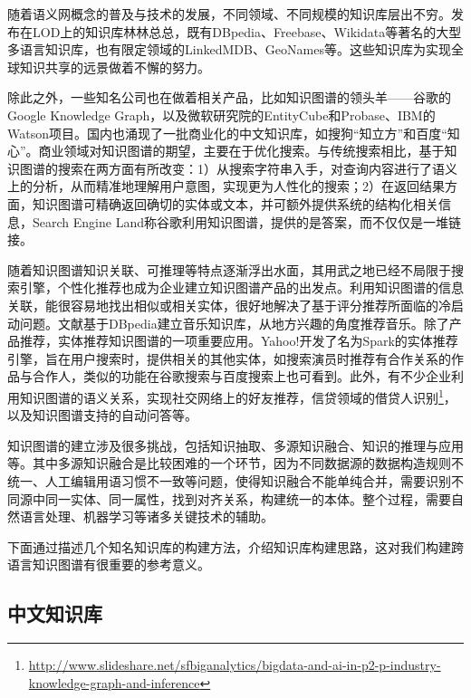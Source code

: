 随着语义网概念的普及与技术的发展，不同领域、不同规模的知识库层出不穷。发布在LOD上的知识库林林总总，既有DBpedia、Freebase、Wikidata等著名的大型多语言知识库，也有限定领域的LinkedMDB\cite{erxleben2014introducing}、GeoNames\cite{wick2011geonames}等。这些知识库为实现全球知识共享的远景做着不懈的努力。

除此之外，一些知名公司也在做着相关产品，比如知识图谱的领头羊——谷歌的Google Knowledge Graph\cite{singhal2012introducing}，以及微软研究院的EntityCube\cite{nie2012statistical}和Probase\cite{wu2012probase}、IBM的Watson项目\cite{ferrucci2012introduction}。国内也涌现了一批商业化的中文知识库，如搜狗“知立方”和百度“知心”。商业领域对知识图谱的期望，主要在于优化搜索。与传统搜索相比，基于知识图谱的搜索在两方面有所改变：1）从搜索字符串入手，对查询内容进行了语义上的分析，从而精准地理解用户意图，实现更为人性化的搜索；2）在返回结果方面，知识图谱可精确返回确切的实体或文本，并可额外提供系统的结构化相关信息，Search Engine Land称谷歌利用知识图谱，提供的是答案，而不仅仅是一堆链接\cite{sullivan2012google}。

随着知识图谱知识关联、可推理等特点逐渐浮出水面，其用武之地已经不局限于搜索引擎，个性化推荐也成为企业建立知识图谱产品的出发点\cite{Burke00knowledge-basedrecommender,aggarwal2016knowledge}。利用知识图谱的信息关联，能很容易地找出相似或相关实体，很好地解决了基于评分推荐所面临的冷启动问题。文献\cite{passant2010dbrec,kaminskas2012knowledge}基于DBpedia建立音乐知识库，从地方兴趣的角度推荐音乐。除了产品推荐，实体推荐知识图谱的一项重要应用。Yahoo!开发了名为Spark的实体推荐引擎\cite{blanco2013entity}，旨在用户搜索时，提供相关的其他实体，如搜索演员时推荐有合作关系的作品与合作人，类似的功能在谷歌搜索与百度搜索上也可看到。此外，有不少企业利用知识图谱的语义关系，实现社交网络上的好友推荐\cite{venkataramani2012tao}，信贷领域的借贷人识别\footnote{\url{http://www.slideshare.net/sfbiganalytics/bigdata-and-ai-in-p2-p-industry-knowledge-graph-and-inference}}，以及知识图谱支持的自动问答等\cite{yih2015semantic,yang2014joint}。

知识图谱的建立涉及很多挑战，包括知识抽取、多源知识融合、知识的推理与应用等。其中多源知识融合是比较困难的一个环节，因为不同数据源的数据构造规则不统一、人工编辑用语习惯不一致等问题，使得知识融合不能单纯合并，需要识别不同源中同一实体、同一属性，找到对齐关系，构建统一的本体。整个过程，需要自然语言处理、机器学习等诸多关键技术的辅助。

下面通过描述几个知名知识库的构建方法，介绍知识库构建思路，这对我们构建跨语言知识图谱有很重要的参考意义。

\subsection{中文知识库}

